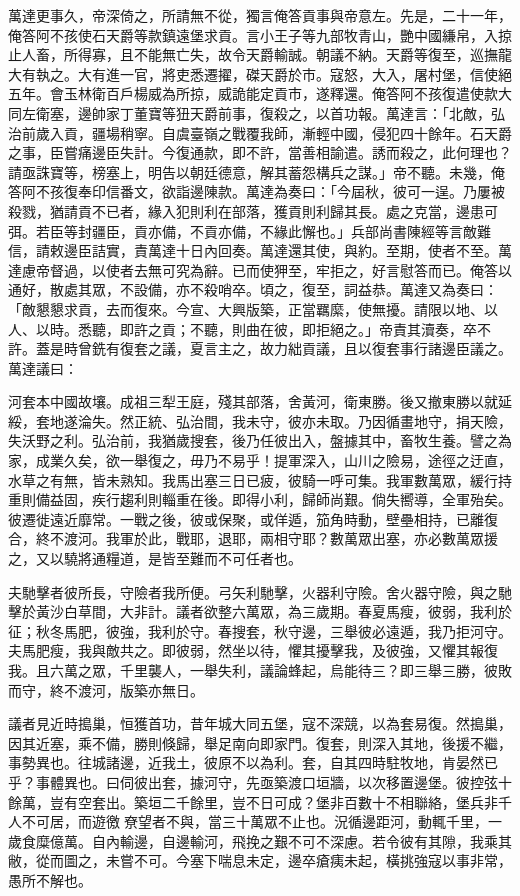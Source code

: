 \begin{pinyinscope}
萬達更事久，帝深倚之，所請無不從，獨言俺答貢事與帝意左。先是，二十一年，俺答阿不孩使石天爵等款鎮遠堡求貢。言小王子等九部牧青山，艷中國縑帛，入掠止人畜，所得寡，且不能無亡失，故令天爵輸誠。朝議不納。天爵等復至，巡撫龍大有執之。大有進一官，將吏悉遷擢，磔天爵於市。寇怒，大入，屠村堡，信使絕五年。會玉林衛百戶楊威為所掠，威詭能定貢市，遂釋還。俺答阿不孩復遣使款大同左衛塞，邊帥家丁董寶等狃天爵前事，復殺之，以首功報。萬達言：「北敵，弘治前歲入貢，疆場稍寧。自虞臺嶺之戰覆我師，漸輕中國，侵犯四十餘年。石天爵之事，臣嘗痛邊臣失計。今復通款，即不許，當善相諭遣。誘而殺之，此何理也？請亟誅寶等，榜塞上，明告以朝廷德意，解其蓄怨構兵之謀。」帝不聽。未幾，俺答阿不孩復奉印信番文，欲詣邊陳款。萬達為奏曰：「今屆秋，彼可一逞。乃屢被殺戮，猶請貢不已者，緣入犯則利在部落，獲貢則利歸其長。處之克當，邊患可弭。若臣等封疆臣，貢亦備，不貢亦備，不緣此懈也。」兵部尚書陳經等言敵難信，請敕邊臣詰實，責萬達十日內回奏。萬達還其使，與約。至期，使者不至。萬達慮帝督過，以使者去無可究為辭。已而使狎至，牢拒之，好言慰答而已。俺答以通好，散處其眾，不設備，亦不殺哨卒。頃之，復至，詞益恭。萬達又為奏曰：「敵懇懇求貢，去而復來。今宣、大興版築，正當羈縻，使無擾。請限以地、以人、以時。悉聽，即許之貢；不聽，則曲在彼，即拒絕之。」帝責其瀆奏，卒不許。蓋是時曾銑有復套之議，夏言主之，故力絀貢議，且以復套事行諸邊臣議之。萬達議曰：

河套本中國故壤。成祖三犁王庭，殘其部落，舍黃河，衛東勝。後又撤東勝以就延綏，套地遂淪失。然正統、弘治間，我未守，彼亦未取。乃因循畫地守，捐天險，失沃野之利。弘治前，我猶歲搜套，後乃任彼出入，盤據其中，畜牧生養。譬之為家，成業久矣，欲一舉復之，毋乃不易乎！提軍深入，山川之險易，途徑之迂直，水草之有無，皆未熟知。我馬出塞三日已疲，彼騎一呼可集。我軍數萬眾，緩行持重則備益固，疾行趨利則輜重在後。即得小利，歸師尚艱。倘失嚮導，全軍殆矣。彼遷徙遠近靡常。一戰之後，彼或保聚，或佯遁，笳角時動，壁壘相持，已離復合，終不渡河。我軍於此，戰耶，退耶，兩相守耶？數萬眾出塞，亦必數萬眾援之，又以驍將通糧道，是皆至難而不可任者也。

夫馳擊者彼所長，守險者我所便。弓矢利馳擊，火器利守險。舍火器守險，與之馳擊於黃沙白草間，大非計。議者欲整六萬眾，為三歲期。春夏馬瘦，彼弱，我利於征；秋冬馬肥，彼強，我利於守。春搜套，秋守邊，三舉彼必遠遁，我乃拒河守。夫馬肥瘦，我與敵共之。即彼弱，然坐以待，懼其擾擊我，及彼強，又懼其報復我。且六萬之眾，千里襲人，一舉失利，議論蜂起，烏能待三？即三舉三勝，彼敗而守，終不渡河，版築亦無日。

議者見近時搗巢，恒獲首功，昔年城大同五堡，寇不深競，以為套易復。然搗巢，因其近塞，乘不備，勝則倏歸，舉足南向即家門。復套，則深入其地，後援不繼，事勢異也。往城諸邊，近我土，彼原不以為利。套，自其四時駐牧地，肯晏然已乎？事體異也。曰伺彼出套，據河守，先亟築渡口垣牆，以次移置邊堡。彼控弦十餘萬，豈有空套出。築垣二千餘里，豈不日可成？堡非百數十不相聯絡，堡兵非千人不可居，而遊徼尞望者不與，當三十萬眾不止也。況循邊距河，動輒千里，一歲食糜億萬。自內輸邊，自邊輸河，飛挽之艱不可不深慮。若令彼有其隙，我乘其敝，從而圖之，未嘗不可。今塞下喘息未定，邊卒瘡痍未起，橫挑強寇以事非常，愚所不解也。


\end{pinyinscope}
